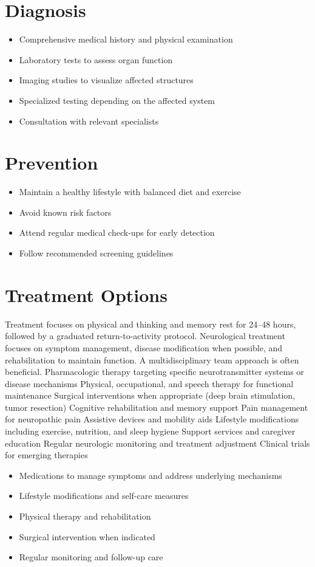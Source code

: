 \section{Diagnosis}
\begin{itemize}[noitemsep]
  \item Comprehensive medical history and physical examination
  \item Laboratory tests to assess organ function
  \item Imaging studies to visualize affected structures
  \item Specialized testing depending on the affected system
  \item Consultation with relevant specialists
\end{itemize}
\section{Prevention}
\begin{itemize}[noitemsep]
  \item Maintain a healthy lifestyle with balanced diet and exercise
  \item Avoid known risk factors
  \item Attend regular medical check-ups for early detection
  \item Follow recommended screening guidelines
\end{itemize}
\section{Treatment Options}
Treatment focuses on physical and thinking and memory rest for 24--48 hours, followed by a graduated return-to-activity protocol. Neurological treatment focuses on symptom management, disease modification when possible, and rehabilitation to maintain function. A multidisciplinary team approach is often beneficial. Pharmacologic therapy targeting specific neurotransmitter systems or disease mechanisms Physical, occupational, and speech therapy for functional maintenance Surgical interventions when appropriate (deep brain stimulation, tumor resection) Cognitive rehabilitation and memory support Pain management for neuropathic pain Assistive devices and mobility aids Lifestyle modifications including exercise, nutrition, and sleep hygiene Support services and caregiver education Regular neurologic monitoring and treatment adjustment Clinical trials for emerging therapies

\begin{itemize}[noitemsep]
  \item Medications to manage symptoms and address underlying mechanisms
  \item Lifestyle modifications and self-care measures
  \item Physical therapy and rehabilitation
  \item Surgical intervention when indicated
  \item Regular monitoring and follow-up care
\end{itemize}
